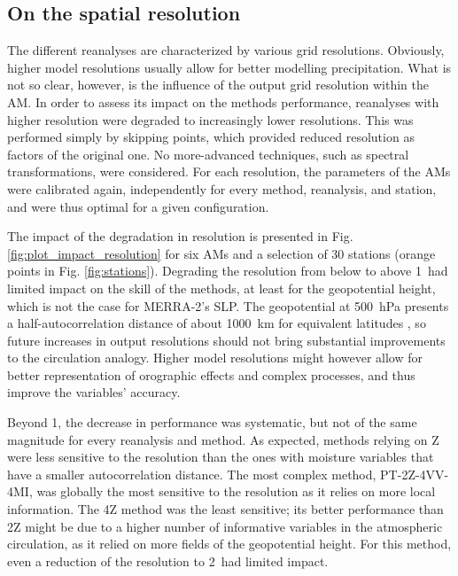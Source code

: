 \documentclass[smallextended]{svjour3}       %
\begin{document}
	\subsection{On the spatial resolution}
	\label{sec:resolution}
	
	The different reanalyses are characterized by various grid resolutions. Obviously, higher model resolutions usually allow for better modelling precipitation. What is not so clear, however, is the influence of the output grid resolution within the AM. In order to assess its impact on the methods performance, reanalyses with higher resolution were degraded to increasingly lower resolutions. This was performed simply by skipping points, which provided reduced resolution as factors of the original one. No more-advanced techniques, such as spectral transformations, were considered. For each resolution, the parameters of the AMs were calibrated again, independently for every method, reanalysis, and station, and were thus optimal for a given configuration. 
	
	The impact of the degradation in resolution is presented in Fig. \ref{fig:plot_impact_resolution} for six AMs and a selection of 30 stations (orange points in Fig. \ref{fig:stations}). Degrading the resolution from below to above 1\degree\ had limited impact on the skill of the methods, at least for the geopotential height, which is not the case for MERRA-2's SLP. The geopotential at 500~hPa presents a half-autocorrelation distance of about 1000~km for equivalent latitudes \citep{Thiebaux1985}, so future increases in output resolutions should not bring substantial improvements to the circulation analogy. Higher model resolutions might however allow for better representation of orographic effects and complex processes, and thus improve the variables' accuracy. 
	
	Beyond 1\degree, the decrease in performance was systematic, but not of the same magnitude for every reanalysis and method. As expected, methods relying on Z were less sensitive to the resolution than the ones with moisture variables that have a smaller autocorrelation distance. The most complex method, PT-2Z-4VV-4MI, was globally the most sensitive to the resolution as it relies on more local information. The 4Z method was the least sensitive; its better performance than 2Z might be due to a higher number of informative variables in the atmospheric circulation, as it relied on more fields of the geopotential height. For this method, even a reduction of the resolution to 2\degree\ had limited impact.
	
\end{document}
